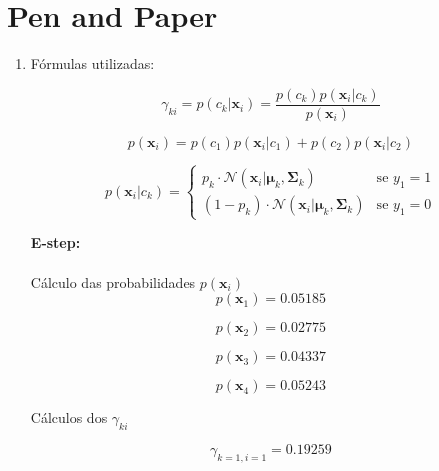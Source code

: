\documentclass[a4paper,12pt]{article} %
\begin{document}
\section*{Pen and Paper}
\begin{enumerate}

\item Fórmulas utilizadas:

\begin{equation}
    \gamma_{ki} = p(c_k|\mathbf{x}_i) = \frac{p(c_k)p(\mathbf{x}_i|c_k)}{p(\mathbf{x}_i)}
\end{equation}

\begin{equation}
    p(\mathbf{x}_i) = p(c_1)p(\mathbf{x}_i|c_1)+p(c_2)p(\mathbf{x}_i|c_2)
\end{equation}

\begin{equation}
    p(\mathbf{x}_i|c_k) =
    \begin{cases} 
        p_{k} \cdot \mathcal{N}(\mathbf{x}_i|\boldsymbol{\mu}_k,\boldsymbol{\Sigma}_k) & \text{se } y_1 = 1 \\
        (1-p_k) \cdot \mathcal{N}(\mathbf{x}_i|\boldsymbol{\mu}_k,\boldsymbol{\Sigma}_k) & \text{se } y_1 = 0 
    \end{cases}
\end{equation}

\textbf{E-step:} \\ \\

Cálculo das probabilidades $p(\textbf{x}_i)$
\begin{equation*}
    p(\textbf{x}_1) = 0.05185
\end{equation*}

\begin{equation*}
    p(\textbf{x}_2) = 0.02775
\end{equation*}

\begin{equation*}
    p(\textbf{x}_3) = 0.04337
\end{equation*}

\begin{equation*}
    p(\textbf{x}_4) = 0.05243
\end{equation*}

Cálculos dos $\gamma_{ki}$

\begin{equation*}
    \gamma_{k=1,i=1} = 0.19259
\end{equation*}


\end{enumerate}
\end{document}
